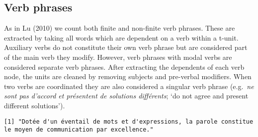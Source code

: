 \documentclass[
]{article}
\newenvironment{Shaded}{\begin{snugshade}}{\end{snugshade}}
\newcommand{\CommentTok}[1]{\textcolor[rgb]{0.56,0.35,0.01}{\textit{#1}}}
\newcommand{\DataTypeTok}[1]{\textcolor[rgb]{0.13,0.29,0.53}{#1}}
\newcommand{\KeywordTok}[1]{\textcolor[rgb]{0.13,0.29,0.53}{\textbf{#1}}}
\newcommand{\NormalTok}[1]{#1}
\newcommand{\OtherTok}[1]{\textcolor[rgb]{0.56,0.35,0.01}{#1}}
\newcommand{\StringTok}[1]{\textcolor[rgb]{0.31,0.60,0.02}{#1}}
\begin{document}
\begin{Shaded}
\end{Shaded}

\hypertarget{verb-phrases}{%
\subsection{Verb phrases}\label{verb-phrases}}

As in Lu (2010) we count both finite and non-finite verb phrases. These
are extracted by taking all words which are dependent on a verb within a
t-unit. Auxiliary verbs do not constitute their own verb phrase but are
considered part of the main verb they modify. However, verb phrases with
modal verbs are considered separate verb phrases. After extracting the
dependents of each verb node, the units are cleaned by removing subjects
and pre-verbal modifiers. When two verbs are coordinated they are also
considered a singular verb phrase (e.g.~\emph{ne sont pas d'accord et
présentent de solutions différents}; `do not agree and present different
solutions').

\begin{verbatim}
[1] "Dotée d'un éventail de mots et d'expressions, la parole constitue le moyen de communication par excellence."
\end{verbatim}
\end{document}
